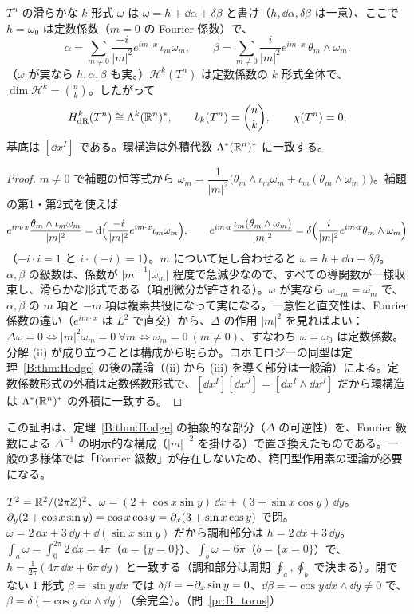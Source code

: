 \begin{thm}\label{B:thm:HodgeT}\tP
$T^n$ の滑らかな $k$ 形式 $\omega$ は $\omega=h+\dd\alpha+\delta\beta$ と書け（$h,\dd\alpha,\delta\beta$ は一意）、ここで $h=\omega_0$ は定数係数（$m=0$ の Fourier 係数）で、
\[
\alpha=\sum_{m\ne0}\frac{-i}{|m|^2}e^{im\cdot x}\,\iota_m\omega_m,\qquad\beta=\sum_{m\ne0}\frac{i}{|m|^2}e^{im\cdot x}\,\theta_m\wedge\omega_m .
\]
（$\omega$ が実なら $h,\alpha,\beta$ も実。）$\mathcal H^k(T^n)$ は定数係数の $k$ 形式全体で、$\dim\mathcal H^k=\binom nk$。したがって
\[
H^k_{\rm dR}(T^n)\cong\Lambda^k(\mathbb R^n)^*,\qquad b_k(T^n)=\binom nk,\qquad\chi(T^n)=0,
\]
基底は $[\dd x^I]$ である。環構造は外積代数 $\Lambda^*(\mathbb R^n)^*$ に一致する。
\end{thm}
\begin{proof}
$m\ne0$ で補題の恒等式から $\omega_m=\dfrac1{|m|^2}\bigl(\theta_m\wedge\iota_m\omega_m+\iota_m(\theta_m\wedge\omega_m)\bigr)$。補題の第1・第2式を使えば
\[
e^{im\cdot x}\frac{\theta_m\wedge\iota_m\omega_m}{|m|^2}=\mathrm{d}\Bigl(\frac{-i}{|m|^2}e^{im\cdot x}\iota_m\omega_m\Bigr),\qquad
e^{im\cdot x}\frac{\iota_m(\theta_m\wedge\omega_m)}{|m|^2}=\delta\Bigl(\frac{i}{|m|^2}e^{im\cdot x}\theta_m\wedge\omega_m\Bigr)
\]
（$-i\cdot i=1$ と $i\cdot(-i)=1$）。$m$ について足し合わせると $\omega=h+\dd\alpha+\delta\beta$。$\alpha,\beta$ の級数は、係数が $|m|^{-1}|\omega_m|$ 程度で急減少なので、すべての導関数が一様収束し、滑らかな形式である（項別微分が許される）。$\omega$ が実なら $\omega_{-m}=\overline{\omega_m}$ で、$\alpha,\beta$ の $m$ 項と $-m$ 項は複素共役になって実になる。一意性と直交性は、Fourier 係数の違い（$e^{im\cdot x}$ は $L^2$ で直交）から、$\Delta$ の作用 $|m|^2$ を見ればよい：$\Delta\omega=0\iff|m|^2\omega_m=0\ \forall m\iff\omega_m=0\ (m\neq0)$、すなわち $\omega=\omega_0$ は定数係数。分解 (ii) が成り立つことは構成から明らか。コホモロジーの同型は定理~\ref{B:thm:Hodge} の後の議論（(ii) から (iii) を導く部分は一般論）による。定数係数形式の外積は定数係数形式で、$[\dd x^I][\dd x^J]=[\dd x^I\wedge\dd x^J]$ だから環構造は $\Lambda^*(\mathbb R^n)^*$ の外積に一致する。
\end{proof}
\begin{rem}
この証明は、定理~\ref{B:thm:Hodge} の抽象的な部分（$\Delta$ の可逆性）を、Fourier 級数による $\Delta^{-1}$ の明示的な構成（$|m|^{-2}$ を掛ける）で置き換えたものである。一般の多様体では「Fourier 級数」が存在しないため、楕円型作用素の理論が必要になる。
\end{rem}

\begin{ex}[$T^2$ 上の分解]\label{B:ex:T2Hodge}
$T^2=\mathbb R^2/(2\pi\mathbb Z)^2$、$\omega=(2+\cos x\sin y)\,\dd x+(3+\sin x\cos y)\,\dd y$。$\partial_y(2+\cos x\sin y)=\cos x\cos y=\partial_x(3+\sin x\cos y)$ で閉。$\omega=2\,\dd x+3\,\dd y+\dd(\sin x\sin y)$ だから調和部分は $h=2\,\dd x+3\,\dd y$。$\int_a\omega=\int_0^{2\pi}2\,\dd x=4\pi$（$a=\{y=0\}$）、$\int_b\omega=6\pi$（$b=\{x=0\}$）で、$h=\frac1{2\pi}(4\pi\,\dd x+6\pi\,\dd y)$ と一致する（調和部分は周期 $\oint_a,\oint_b$ で決まる）。閉でない $1$ 形式 $\beta=\sin y\,\dd x$ では $\delta\beta=-\partial_x\sin y=0$、$\dd\beta=-\cos y\,\dd x\wedge\dd y\ne0$ で、$\beta=\delta(-\cos y\,\dd x\wedge\dd y)$（余完全）。（問~\ref{pr:B_torus}）
\end{ex}

